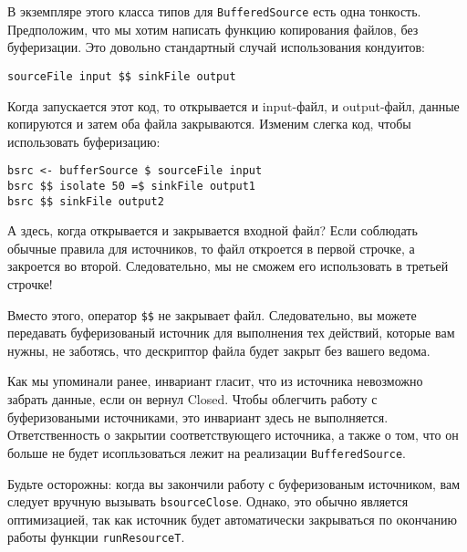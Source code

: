 В экземпляре этого класса типов для \lstinline'BufferedSource' есть одна тонкость.
Предположим, что мы хотим написать функцию копирования файлов, без
буферизации. Это довольно стандартный случай использования кондуитов:
\begin{lstlisting}
sourceFile input $$ sinkFile output
\end{lstlisting}
Когда запускается этот код, то открывается и input-файл, и output-файл, данные 
копируются и затем оба файла закрываются. Изменим слегка код, чтобы 
использовать буферизацию:
\begin{lstlisting}
bsrc <- bufferSource $ sourceFile input
bsrc $$ isolate 50 =$ sinkFile output1
bsrc $$ sinkFile output2
\end{lstlisting}
А здесь, когда открывается и закрывается входной файл? Если соблюдать обычные 
правила для источников, то файл откроется в первой строчке, а закроется во 
второй. Следовательно, мы не сможем его использовать в третьей строчке!

Вместо этого, оператор \verb#$$# не закрывает файл. Следовательно, вы можете 
передавать буферизованый источник для выполнения тех действий, которые вам 
нужны, не заботясь, что дескриптор файла будет закрыт без вашего ведома.

\begin{remark}
Как мы упоминали ранее, инвариант гласит, что из источника невозможно забрать 
данные, если он вернул Closed. Чтобы облегчить работу с буферизоваными 
источниками, это инвариант здесь не выполняется. Ответственность о закрытии 
соответствующего источника, а также о том, что он больше не будет исопльзоваться
лежит на реализации \lstinline'BufferedSource'.
\end{remark}

Будьте осторожны: когда вы закончили работу с буферизованым источником, вам 
следует вручную вызывать \lstinline'bsourceClose'. Однако, это обычно является 
оптимизацией, так как источник будет автоматически закрываться по окончанию 
работы функции \lstinline'runResourceT'.

